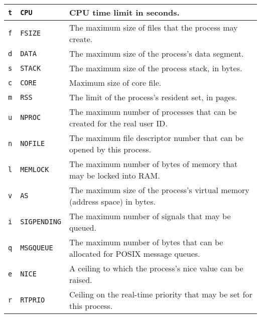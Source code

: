 \documentclass[a4paper,12pt]{article}
\begin{document}
\begin{longtable}{|l|l|p{10cm}|}
\hline

\texttt{t} & \texttt{CPU} & CPU time limit in seconds. \\

\hline

\texttt{f} & \texttt{FSIZE} & The maximum size of files that the
process may create. \\

\hline

\texttt{d} & \texttt{DATA} & The maximum size of the process's data
segment. \\

\hline

\texttt{s} & \texttt{STACK} & The maximum size of the process stack,
in bytes. \\

\hline

\texttt{c} & \texttt{CORE} & Maximum size of core file. \\

\hline

\texttt{m} & \texttt{RSS} & The limit of the process's resident set,
in pages. \\

\hline

\texttt{u} & \texttt{NPROC} & The maximum number of processes that can
be created for the real user ID. \\

\hline

\texttt{n} & \texttt{NOFILE} & The maximum file descriptor number that
can be opened by this process. \\

\hline

\texttt{l} & \texttt{MEMLOCK} & The maximum number of bytes of memory
that may be locked into RAM. \\

\hline

\texttt{v} & \texttt{AS} & The maximum size of the process's virtual
memory (address space) in bytes. \\

\hline

\texttt{i} & \texttt{SIGPENDING} & The maximum number of signals that
may be queued. \\

\hline

\texttt{q} & \texttt{MSGQUEUE} & The maximum number of bytes that can
be allocated for POSIX message queues. \\

\hline

\texttt{e} & \texttt{NICE} & A ceiling to which the process's nice
value can be raised. \\

\hline

\texttt{r} & \texttt{RTPRIO} & Ceiling on the real-time priority that
may be set for this process. \\

\hline
\end{longtable}
\end{document}
